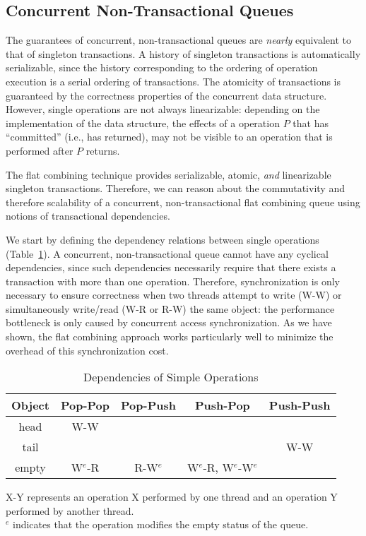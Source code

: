 \subsection{Concurrent Non-Transactional Queues}


The guarantees of concurrent, non-transactional queues are \emph{nearly} equivalent to that of singleton transactions. A history of singleton transactions is automatically serializable, since the history corresponding to the ordering of operation execution is a serial ordering of transactions. The atomicity of transactions is guaranteed by the correctness properties of the concurrent data structure. However, single operations are not always linearizable: depending on the implementation of the data structure, the effects of a operation $P$ that has ``committed'' (i.e., has returned), may not be visible to an operation that is performed after $P$ returns.

The flat combining technique provides serializable, atomic, \emph{and} linearizable singleton transactions\cite{flatcombining}. Therefore, we can reason about the commutativity and therefore scalability of a concurrent, non-transactional flat combining queue using notions of transactional dependencies.

We start by defining the dependency relations between single operations (Table~\ref{table:simpledeps}). A concurrent, non-transactional queue cannot have any cyclical dependencies, since such dependencies necessarily require that there exists a transaction with more than one operation. Therefore, synchronization is only necessary to ensure correctness when two threads attempt to write (W-W) or simultaneously write/read (W-R or R-W) the same object: the performance bottleneck is only caused by concurrent access synchronization. As we have shown, the flat combining approach works particularly well to minimize the overhead of this synchronization cost.

\begin{table}[h!]
    \centering
\begin{tabular}{c||c|c|c|c}
    Object & Pop-Pop & Pop-Push & Push-Pop & Push-Push\\
    \hline
    head & W-W & & & \\
    tail & & & & W-W\\
    empty & W$^e$-R & R-W$^e$ & W$^e$-R, W$^e$-W$^e$ & \\
\end{tabular}
    \caption*{X-Y represents an operation X performed by one thread and an operation Y performed by another thread.\\$^e$ indicates that the operation modifies the empty status of the queue.}
    \caption{Dependencies of Simple Operations}
    \label{table:simpledeps}
\end{table}

